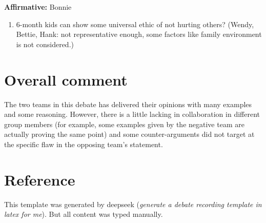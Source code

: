 \documentclass[12pt]{article}
\newcommand{\affirmative}[1]{{\color{affirmcolor}\textbf{Affirmative:} #1}}
\begin{document}
\affirmative{Bonnie
\begin{enumerate}
    \item 6-month kids can show some universal ethic of not hurting others? (Wendy, Bettie, Hank: not representative enough, some factors like family environment is not considered.)
\end{enumerate}
}

\section*{Overall comment} The two teams in this debate has delivered their opinions with many examples and some reasoning. However, there is a little lacking in collaboration in different group members (for example, some examples given by the negative team are actually proving the same point) and some counter-arguments did not target at the specific flaw in the opposing team's statement. 

\section*{Reference}

This template was generated by deepseek (\textit{generate a debate recording template in latex for me}). But all content was typed manually.
\end{document}
